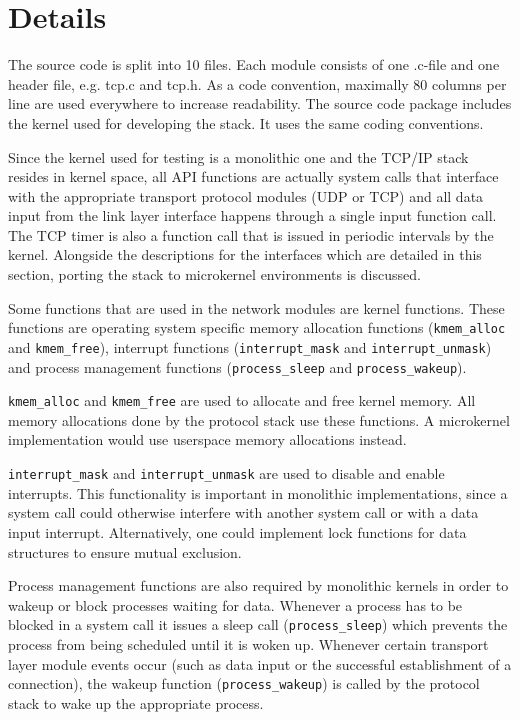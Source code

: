 \documentclass[11pt,twoside,abstract,notitlepage]{scrreprt}
\begin{document}
\section{Details}
The source code is split into 10 files. Each module consists of one .c-file and one header file, e.g. tcp.c and tcp.h. As a code convention, maximally 80 columns per line are used everywhere to increase readability. The source code package includes the kernel used for developing the stack. It uses the same coding conventions.

Since the kernel used for testing is a monolithic one and the TCP/IP stack resides in kernel space, all API functions are actually system calls that interface with the appropriate transport protocol modules (UDP or TCP) and all data input from the link layer interface happens through a single input function call. The TCP timer is also a function call that is issued in periodic intervals by the kernel. Alongside the descriptions for the interfaces which are detailed in this section, porting the stack to microkernel environments is discussed.

Some functions that are used in the network modules are kernel functions. These functions are operating system specific memory allocation functions (\texttt{kmem\_alloc} and \texttt{kmem\_free}), interrupt functions (\texttt{interrupt\_mask} and \texttt{interrupt\_unmask}) and process management functions (\texttt{process\_sleep} and \texttt{process\_wakeup}). 

\texttt{kmem\_alloc} and \texttt{kmem\_free} are used to allocate and free kernel memory. All memory allocations done by the protocol stack use these functions. A microkernel implementation would use userspace memory allocations instead. 

\texttt{interrupt\_mask} and \texttt{interrupt\_unmask} are used to disable and enable interrupts. This functionality is important in monolithic implementations, since a system call could otherwise interfere with another system call or with a data input interrupt. Alternatively, one could implement lock functions for data structures to ensure mutual exclusion. 

Process management functions are also required by monolithic kernels in order to wakeup or block processes waiting for data. Whenever a process has to be blocked in a system call it issues a sleep call (\texttt{process\_sleep}) which prevents the process from being scheduled until it is woken up. Whenever certain transport layer module events occur (such as data input or the successful establishment of a connection), the wakeup function (\texttt{process\_wakeup}) is called by the protocol stack to wake up the appropriate process. 
\end{document}
